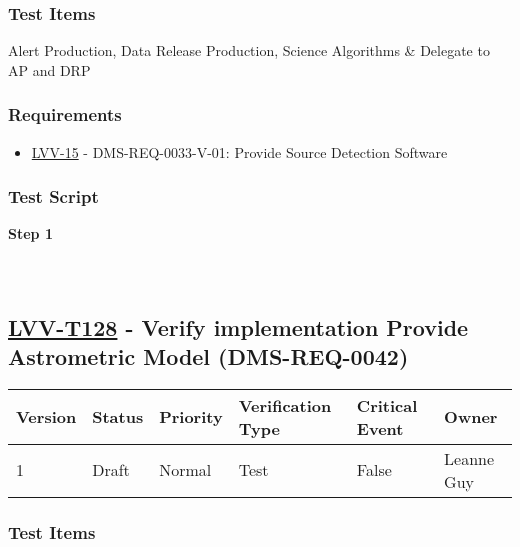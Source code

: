 \hypertarget{test-items-103}{%
\subsubsection{Test Items}\label{test-items-103}}

Alert Production, Data Release Production, Science Algorithms \&
Delegate to AP and DRP

\hypertarget{requirements-104}{%
\subsubsection{Requirements}\label{requirements-104}}

\begin{itemize}
\tightlist
\item
  \href{https://jira.lsstcorp.org/browse/LVV-15}{LVV-15} -
  DMS-REQ-0033-V-01: Provide Source Detection Software
\end{itemize}

\hypertarget{test-script-104}{%
\subsubsection{Test Script}\label{test-script-104}}

\textbf{Step 1}\\
~\\
~\\

\hypertarget{lvv-t128---verify-implementation-provide-astrometric-model-dms-req-0042}{%
\subsection{\texorpdfstring{\href{https://jira.lsstcorp.org/secure/Tests.jspa\#/testCase/LVV-T128}{LVV-T128}
- Verify implementation Provide Astrometric Model
(DMS-REQ-0042)}{LVV-T128 - Verify implementation Provide Astrometric Model (DMS-REQ-0042)}}\label{lvv-t128---verify-implementation-provide-astrometric-model-dms-req-0042}}

\begin{longtable}[]{@{}llllll@{}}
\toprule
Version & Status & Priority & Verification Type & Critical Event &
Owner\tabularnewline
\midrule
\endhead
1 & Draft & Normal & Test & False & Leanne Guy\tabularnewline
\bottomrule
\end{longtable}

\hypertarget{test-items-104}{%
\subsubsection{Test Items}\label{test-items-104}}


